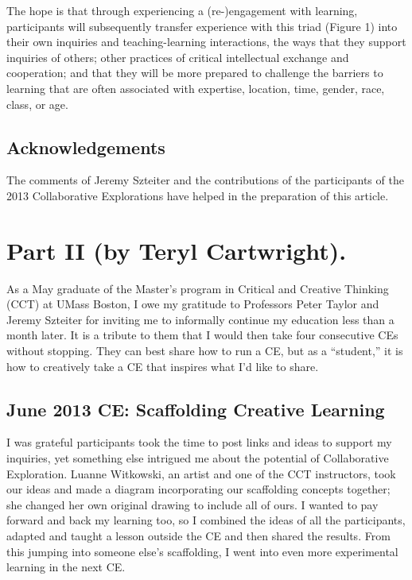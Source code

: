The hope is that through experiencing a (re-)engagement with learning,
participants will subsequently transfer experience with this triad
(Figure 1) into their own inquiries and teaching-learning
interactions, the ways that they support inquiries of others; other
practices of critical intellectual exchange and cooperation; and that
they will be more prepared to challenge the barriers to learning that
are often associated with expertise, location, time, gender, race,
class, or age.

\subsection{Acknowledgements}

The comments of Jeremy Szteiter and the contributions of the
participants of the 2013 Collaborative Explorations have helped in the
preparation of this article.

\section*{Part II (by Teryl Cartwright).}

As a May graduate of the Master's program in
Critical and Creative Thinking (CCT) at UMass Boston, I owe my gratitude
to Professors Peter Taylor and Jeremy Szteiter for inviting me to
informally continue my education less than a month later. It is a
tribute to them that I would then take four consecutive CEs without
stopping. They can best share how to run a CE, but as a ``student,'' it
is how to creatively take a CE that inspires what I'd like to share.

\subsection{June 2013 CE: Scaffolding Creative Learning}

I was grateful participants took the time to post links and ideas to
support my inquiries, yet something else intrigued me about the
potential of Collaborative Exploration. Luanne Witkowski, an artist and
one of the CCT instructors, took our ideas and made a diagram
incorporating our scaffolding concepts together; she changed her own
original drawing to include all of ours. I wanted to pay forward and
back my learning too, so I combined the ideas of all the participants,
adapted and taught a lesson outside the CE and then shared the results.
From this jumping into someone else's scaffolding, I went into even more
experimental learning in the next CE.

